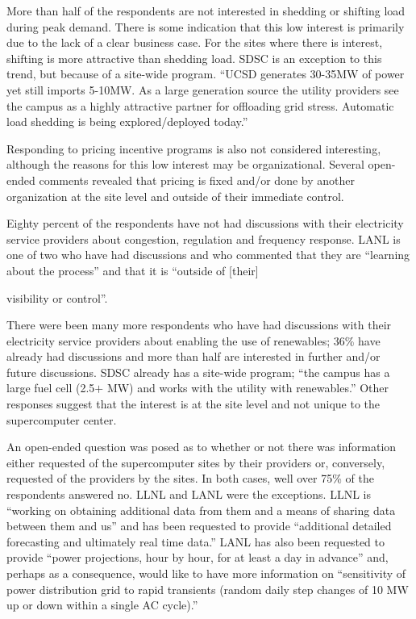 \documentclass{llncs}
\begin{document}
More than half of the respondents are not interested in shedding or shifting
load during peak demand. There is some indication that this low interest is
primarily due to the lack of a clear business case. For the sites where
there is interest, shifting is more attractive than shedding load. SDSC is
an exception to this trend, but because of a site-wide program. ``UCSD
generates 30-35MW of power yet still imports 5-10MW. As a large generation
source the utility providers see the campus as a highly attractive partner
for offloading grid stress. Automatic load shedding is being
explored/deployed today.''

Responding to pricing incentive programs is also not considered interesting,
although the reasons for this low interest may be organizational. Several
open-ended comments revealed that pricing is fixed and/or done by another
organization at the site level and outside of their immediate control.

Eighty percent of the respondents have not had discussions with their
electricity service providers about congestion, regulation and frequency
response. LANL is one of two who have had discussions and who commented that
they are ``learning about the process'' and that it is ``outside of [their]

visibility or control''.

There were been many more respondents who have had discussions with their
electricity service providers about enabling the use of renewables; 36{\%}
have already had discussions and more than half are interested in further
and/or future discussions. SDSC already has a site-wide program; ``the
campus has a large fuel cell (2.5$+$ MW) and works with the utility with
renewables.'' Other responses suggest that the interest is at the site level
and not unique to the supercomputer center.

An open-ended question was posed as to whether or not there was information
either requested of the supercomputer sites by their providers or,
conversely, requested of the providers by the sites. In both cases, well
over 75{\%} of the respondents answered no. LLNL and LANL were the
exceptions. LLNL is ``working on obtaining additional data from them and a
means of sharing data between them and us'' and has been requested to
provide ``additional detailed forecasting and ultimately real time data.''
LANL has also been requested to provide ``power projections, hour by hour,
for at least a day in advance'' and, perhaps as a consequence, would like to
have more information on ``sensitivity of power distribution grid to rapid
transients (random daily step changes of 10 MW up or down within a single AC
cycle).''
\end{document}
